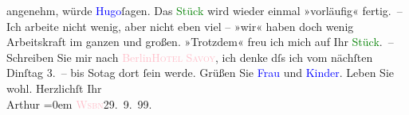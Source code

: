                angenehm, würde {\pb}\textcolor{blue}{Hugo}{}\ledrightnote{\textcolor{blue}{Hugo von Hofmannsthal}}{ }ſagen. Das \textcolor{green}{Stück}{} wird wieder einmal »vorläufig« fertig. – Ich arbeite
               nicht wenig, aber nicht eben viel – »wir« haben doch wenig Arbeitskraft im ganzen und
               großen. »Trotzdem« freu ich mich auf Ihr \textcolor{green}{Stück}{}. – Schreiben {\pb}Sie mir
               nach \textcolor{pink}{Berlin}{}\ledrightnote{\textcolor{pink}{Berlin}}{ }\textcolor{pink}{\textsc{Hotel Savoy}}{}\ledrightnote{\textcolor{pink}{Hotel Savoy}}, ich denke dſs ich vom nächſten Dinſtag 3. – bis So{\geminationn}tag dort ſein werde.\pend
           \pstart
           Grüßen Sie \textcolor{blue}{Frau}{} und \textcolor{blue}{Kinder}{}.\pend
           \pstart
           Leben Sie wohl.\pend
           \pstart
           Herzlichſt Ihr{\\[\baselineskip]}\spacefill\mbox{Arthur}\pend
           \leftskip=0em{}\pstart
           \textcolor{pink}{\textsc{Wsbn}}{}\ledrightnote{\textcolor{pink}{Wiesbaden}}{ }29. 9. 99. \pend
           \endnumbering{}  
      